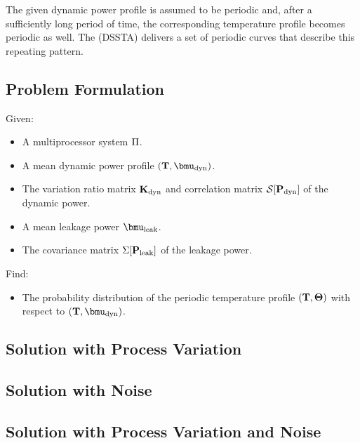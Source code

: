 The given dynamic power profile is assumed to be periodic and, after a sufficiently long period of time, the corresponding temperature profile becomes periodic as well. The  (DSSTA) delivers a set of periodic curves that describe this repeating pattern.

\subsection{Problem Formulation}
Given:
\begin{itemize}
  \item A multiprocessor system $\Pi$.
  \item A mean dynamic power profile $\mpprofile{\dyn}$.
  \item The variation ratio matrix $\mathbf{K}_{\text{dyn}}$ and correlation matrix $\mathcal{S}[{\mathbf{P}_{\text{dyn}}}]$ of the dynamic power.
  \item A mean leakage power $\vmean{\leak}$.
  \item The covariance matrix $\Sigma[\mathbf{P}_{\text{leak}}]$ of the leakage power.
\end{itemize}

Find:
\begin{itemize}
  \item The probability distribution of the periodic temperature profile $(\mathbf{T}, \mathbf{\Theta})$ with respect to $\mpprofile{\dyn}$.
\end{itemize}

\subsection{Solution with Process Variation} 


\subsection{Solution with Noise} 


\subsection{Solution with Process Variation and Noise} 

